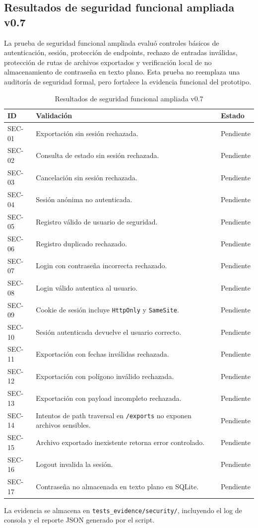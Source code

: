 
\subsection{Resultados de seguridad funcional ampliada v0.7}

La prueba de seguridad funcional ampliada evaluó controles básicos de autenticación,
sesión, protección de endpoints, rechazo de entradas inválidas, protección de rutas de
archivos exportados y verificación local de no almacenamiento de contraseña en texto
plano. Esta prueba no reemplaza una auditoría de seguridad formal, pero fortalece la
evidencia funcional del prototipo.

\begin{table}[H]
\centering
\begin{tabular}{|p{2.3cm}|p{9cm}|p{2.1cm}|}
\hline
\textbf{ID} & \textbf{Validación} & \textbf{Estado} \\
\hline
SEC-01 & Exportación sin sesión rechazada. & Pendiente \\
\hline
SEC-02 & Consulta de estado sin sesión rechazada. & Pendiente \\
\hline
SEC-03 & Cancelación sin sesión rechazada. & Pendiente \\
\hline
SEC-04 & Sesión anónima no autenticada. & Pendiente \\
\hline
SEC-05 & Registro válido de usuario de seguridad. & Pendiente \\
\hline
SEC-06 & Registro duplicado rechazado. & Pendiente \\
\hline
SEC-07 & Login con contraseña incorrecta rechazado. & Pendiente \\
\hline
SEC-08 & Login válido autentica al usuario. & Pendiente \\
\hline
SEC-09 & Cookie de sesión incluye \texttt{HttpOnly} y \texttt{SameSite}. & Pendiente \\
\hline
SEC-10 & Sesión autenticada devuelve el usuario correcto. & Pendiente \\
\hline
SEC-11 & Exportación con fechas inválidas rechazada. & Pendiente \\
\hline
SEC-12 & Exportación con polígono inválido rechazada. & Pendiente \\
\hline
SEC-13 & Exportación con payload incompleto rechazada. & Pendiente \\
\hline
SEC-14 & Intentos de path traversal en \texttt{/exports} no exponen archivos sensibles. & Pendiente \\
\hline
SEC-15 & Archivo exportado inexistente retorna error controlado. & Pendiente \\
\hline
SEC-16 & Logout invalida la sesión. & Pendiente \\
\hline
SEC-17 & Contraseña no almacenada en texto plano en SQLite. & Pendiente \\
\hline
\end{tabular}
\caption{Resultados de seguridad funcional ampliada v0.7}
\end{table}

La evidencia se almacena en \texttt{tests\_evidence/security/}, incluyendo el log de
consola y el reporte JSON generado por el script.
